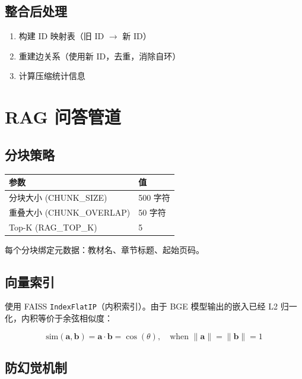 \documentclass[12pt,a4paper]{article}
\begin{document}
\subsection{整合后处理}

\begin{enumerate}[leftmargin=2em]
    \item 构建 ID 映射表（旧 ID $\to$ 新 ID）
    \item 重建边关系（使用新 ID，去重，消除自环）
    \item 计算压缩统计信息
\end{enumerate}

\section{RAG 问答管道}
\label{sec:rag-pipeline}

\subsection{分块策略}

\begin{table}[H]
\centering
\begin{tabular}{ll}
\toprule
\textbf{参数} & \textbf{值} \\
\midrule
分块大小 (CHUNK\_SIZE) & 500 字符 \\
重叠大小 (CHUNK\_OVERLAP) & 50 字符 \\
Top-K (RAG\_TOP\_K) & 5 \\
\bottomrule
\end{tabular}
\end{table}

每个分块绑定元数据：教材名、章节标题、起始页码。

\subsection{向量索引}

使用 FAISS \texttt{IndexFlatIP}（内积索引）。由于 BGE 模型输出的嵌入已经 L2 归一化，内积等价于余弦相似度：

\begin{equation}
\text{sim}(\mathbf{a}, \mathbf{b}) = \mathbf{a} \cdot \mathbf{b} = \cos(\theta), \quad \text{when } \|\mathbf{a}\| = \|\mathbf{b}\| = 1
\end{equation}

\subsection{防幻觉机制}
\end{document}
